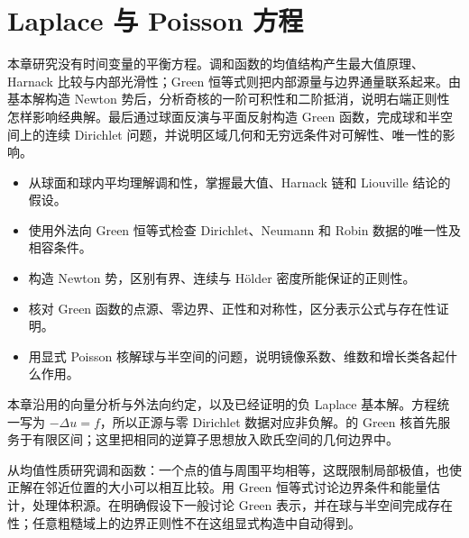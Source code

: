 \chapter{Laplace 与 Poisson 方程}
\label{b2:ch:13}
\begin{chapterabstract}
本章研究没有时间变量的平衡方程。调和函数的均值结构产生最大值原理、Harnack 比较与内部光滑性；Green 恒等式则把内部源量与边界通量联系起来。由基本解构造 Newton 势后，分析奇核的一阶可积性和二阶抵消，说明右端正则性怎样影响经典解。最后通过球面反演与平面反射构造 Green 函数，完成球和半空间上的连续 Dirichlet 问题，并说明区域几何和无穷远条件对可解性、唯一性的影响。
\end{chapterabstract}

\begin{learninggoals}
\begin{itemize}
\item\label{b2:item:13-goal-mean}从球面和球内平均理解调和性，掌握最大值、Harnack 链和 Liouville 结论的假设。
\item\label{b2:item:13-goal-boundary}使用外法向 Green 恒等式检查 Dirichlet、Neumann 和 Robin 数据的唯一性及相容条件。
\item\label{b2:item:13-goal-potential}构造 Newton 势，区别有界、连续与 Hölder 密度所能保证的正则性。
\item\label{b2:item:13-goal-green}核对 Green 函数的点源、零边界、正性和对称性，区分表示公式与存在性证明。
\item\label{b2:item:13-goal-models}用显式 Poisson 核解球与半空间的问题，说明镜像系数、维数和增长类各起什么作用。
\end{itemize}
\end{learninggoals}

本章沿用的向量分析与外法向约定，以及已经证明的负 Laplace 基本解。方程统一写为 \(-\Delta u=f\)，所以正源与零 Dirichlet 数据对应非负解。的 Green 核首先服务于有限区间；这里把相同的逆算子思想放入欧氏空间的几何边界中。

\ProseParagraphBreak

从均值性质研究调和函数：一个点的值与周围平均相等，这既限制局部极值，也使正解在邻近位置的大小可以相互比较。用 Green 恒等式讨论边界条件和能量估计，处理体积源。在明确假设下一般讨论 Green 表示，并在球与半空间完成存在性；任意粗糙域上的边界正则性不在这组显式构造中自动得到。

